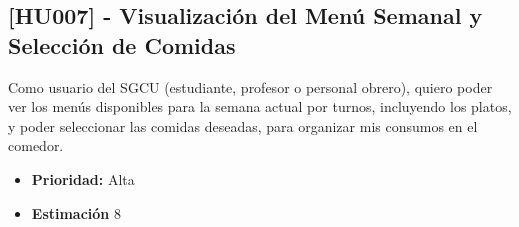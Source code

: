\documentclass[12pt]{article}
\begin{document}
\pagebreak

\subsection{[HU007] - Visualización del Menú Semanal y Selección de Comidas}

Como usuario del SGCU (estudiante, profesor o personal obrero), quiero poder ver los menús disponibles para la semana actual por turnos, incluyendo los platos, y poder seleccionar las comidas deseadas, para organizar mis consumos en el comedor.

\begin{itemize}
	\item \textbf{Prioridad:} Alta
	\item \textbf{Estimación} 8
\end{itemize}
\end{document}
